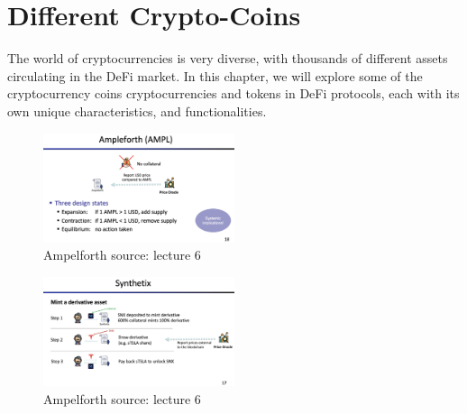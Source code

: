 \documentclass{article}
\begin{document}
\section{Different Crypto-Coins}
The world of cryptocurrencies is very diverse, with thousands of different assets circulating in the DeFi market. In this chapter, we will explore some of the cryptocurrency coins cryptocurrencies and tokens in DeFi protocols, each with its own unique characteristics, and functionalities. 
\begin{figure}[h]
    \centering
    \includegraphics[width=0.5\textwidth]{Bildschirmfoto 2024-04-07 um 17.45.27.png} 
    \caption{Ampelforth \scriptsize{source: lecture 6}}
    \label{fig:DoS-attack}
\end{figure}
\begin{figure}[h]
    \centering
    \includegraphics[width=0.5\textwidth]{Bildschirmfoto 2024-04-07 um 17.45.18.png} 
    \caption{Ampelforth \scriptsize{source: lecture 6}}
    \label{fig:DoS-attack}
\end{figure}
\end{document}
